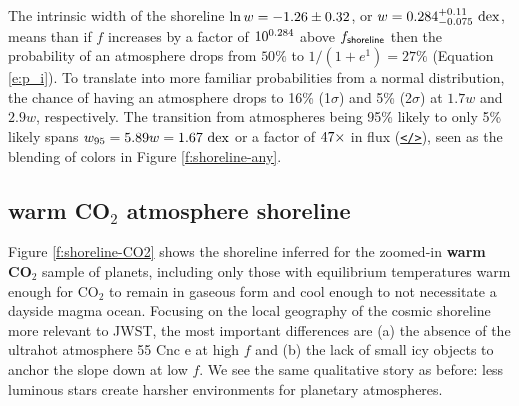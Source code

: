 \documentclass[modern,linenumbers,trackchanges]{aastex7}
\begin{document}
The intrinsic width of the shoreline $\ln w = -1.26 \pm 0.32$, or $w = 0.284_{-0.075}^{+0.11}~\mathrm{dex}$, means than if $f$ increases by a factor of $10^{0.284}$ above $f_{\sf shoreline}$ then the probability of an atmosphere drops from $50\%$ to $1/(1 + e^{1}) = 27\%$ (Equation \ref{e:p_i}). To translate into more familiar probabilities from a normal distribution, the chance of having an atmosphere drops to 16\% (1$\sigma$) and 5\% (2$\sigma$) at $1.7w$ and $2.9w$, respectively. The transition from atmospheres being 95\% likely to only 5\% likely spans $w_{95} = 5.89w = 1.67~\mathrm{dex}$ or a factor of $47 \times$ in flux (\href{https://github.com/zkbt/shoreline/blob/main/notebooks/logistic-probabilities.ipynb}{\texttt{</>}}), seen as the blending of colors in Figure \ref{f:shoreline-any}. 


\subsection{{\bf warm CO$_2$} atmosphere shoreline}

Figure \ref{f:shoreline-CO2} shows the shoreline inferred for the zoomed-in {\bf warm CO$_2$} sample of planets, including only those with equilibrium temperatures warm enough for CO$_2$ to remain in gaseous form and cool enough to not necessitate a dayside magma ocean. Focusing on the local geography of the cosmic shoreline more relevant to JWST, the most important differences are (a) the absence of the ultrahot atmosphere 55 Cnc e at high $f$ and (b) the lack of small icy objects to anchor the slope down at low $f$. We see the same qualitative story as before: less luminous stars create harsher environments for planetary atmospheres. 
\end{document}
